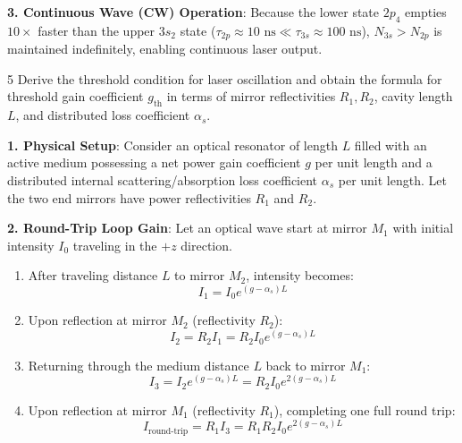 \begin{theorysol}
\textbf{3. Continuous Wave (CW) Operation}:
Because the lower state $2p_4$ empties $10\times$ faster than the upper $3s_2$ state ($\tau_{2p} \approx 10\text{ ns} \ll \tau_{3s} \approx 100\text{ ns}$), $N_{3s} > N_{2p}$ is maintained indefinitely, enabling continuous laser output.
\end{theorysol}
\vspace{4mm}

\begin{theoryq}{5}
Derive the threshold condition for laser oscillation and obtain the formula for threshold gain coefficient $g_{\text{th}}$ in terms of mirror reflectivities $R_1, R_2$, cavity length $L$, and distributed loss coefficient $\alpha_s$.
\end{theoryq}
\begin{theorysol}
\textbf{1. Physical Setup}:
Consider an optical resonator of length $L$ filled with an active medium possessing a net power gain coefficient $g$ per unit length and a distributed internal scattering/absorption loss coefficient $\alpha_s$ per unit length.
Let the two end mirrors have power reflectivities $R_1$ and $R_2$.

\textbf{2. Round-Trip Loop Gain}:
Let an optical wave start at mirror $M_1$ with initial intensity $I_0$ traveling in the $+z$ direction.
\begin{enumerate}
    \item After traveling distance $L$ to mirror $M_2$, intensity becomes:
    \begin{equation}
    I_1 = I_0 e^{(g - \alpha_s)L}
    \end{equation}
    \item Upon reflection at mirror $M_2$ (reflectivity $R_2$):
    \begin{equation}
    I_2 = R_2 I_1 = R_2 I_0 e^{(g - \alpha_s)L}
    \end{equation}
    \item Returning through the medium distance $L$ back to mirror $M_1$:
    \begin{equation}
    I_3 = I_2 e^{(g - \alpha_s)L} = R_2 I_0 e^{2(g - \alpha_s)L}
    \end{equation}
    \item Upon reflection at mirror $M_1$ (reflectivity $R_1$), completing one full round trip:
    \begin{equation}
    I_{\text{round-trip}} = R_1 I_3 = R_1 R_2 I_0 e^{2(g - \alpha_s)L}
    \end{equation}
\end{enumerate}


\end{theorysol}
